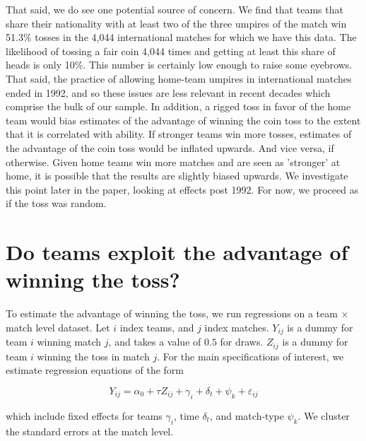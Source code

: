 \documentclass[11pt,  letterpaper]{article}
\begin{document}
That said, we do see one potential source of concern. We find that teams that share their nationality with at least two of the three umpires of the match win 51.3\% tosses in the 4,044 international matches for which we have this data. The likelihood of tossing a fair coin 4,044 times and getting at least this share of heads is only 10\%. This number is certainly low enough to raise some eyebrows. That said, the practice of allowing home-team umpires in international matches ended in 1992, and so these issues are less relevant in recent decades which comprise the bulk of our sample. In addition, a rigged toss in favor of the home team would bias estimates of the advantage of winning the coin toss to the extent that it is correlated with ability. If stronger teams win more tosses, estimates of the advantage of the coin toss would be inflated upwards. And vice versa, if otherwise. Given home teams win more matches and are seen as 'stronger' at home, it is possible that the results are slightly biased upwards. We investigate this point later in the paper, looking at effects post 1992. For now, we proceed as if the toss was random.




\section{Do teams exploit the advantage of winning the toss?}

To estimate the advantage of winning the toss, we run regressions on a team $\times$ match level dataset. Let $i$ index teams, and $j$ index matches. $Y_{ij}$ is a dummy for team $i$ winning match $j$, and takes a value of $0.5$ for draws. $Z_{ij}$ is a dummy for team $i$ winning the toss in match $j$. For the main specifications of interest, we estimate regression equations of the form

\begin{equation}\label{eqn:reduced_form}
Y_{ij} = \alpha_0 + \tau Z_{ij} + \gamma_i + \delta_t + \psi_k + \varepsilon_{ij}
\end{equation}

which include fixed effects for teams $\gamma_i$, time $\delta_t$, and match-type $\psi_k$. We cluster the standard errors at the match level.
\end{document}
